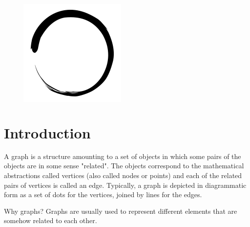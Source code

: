 \documentclass[12pt]{article}
\title{\vspace{-2em}\mytitle\vspace{-0.3em}}
\author{\textbf{Editor}\\Kayacan Vesek\\ \ \\ \textbf{Reviewer} \\Yasin Kaya\\Oğuzhan Özçelik}
\date{}
\begin{document}
\begin{figure}
  \centering
  \includegraphics[width=\linewidth/4]{inzva-logo.png}
  \label{fig:inzva}
\end{figure}
\maketitle

\cleardoublepage
\tableofcontents
{}
\cleardoublepage
\newcommand{\sectionbreak}{\clearpage}

\section{Introduction}

A graph is a structure amounting to a set of objects in which some pairs of the objects are in some sense "related". The objects correspond to the mathematical abstractions called vertices (also called nodes or points) and each of the related pairs of vertices is called an edge. Typically, a graph is depicted in diagrammatic form as a set of dots for the vertices, joined by lines for the edges. \cite{1}

Why graphs? Graphs are usually used to represent different elements that are somehow related to each other.
\end{document}
